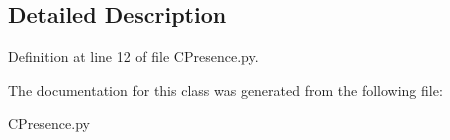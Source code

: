 \subsection{Detailed Description}


Definition at line 12 of file C\+Presence.\+py.



The documentation for this class was generated from the following file\+:\begin{DoxyCompactItemize}
\item 
C\+Presence.\+py\end{DoxyCompactItemize}
